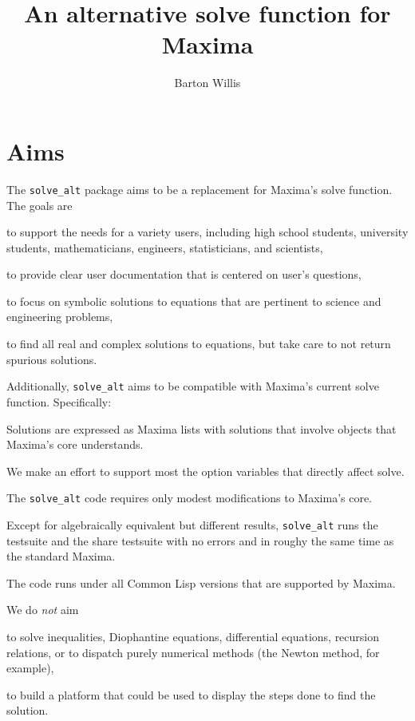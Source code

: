 \documentclass[]{scrartcl}
\title{An alternative solve function for Maxima}
\author{Barton Willis}
\newcommand{\altsolve}{\texttt{solve\_alt}}
\begin{document}
\maketitle

\section{Aims}


The \altsolve\/ package aims to be a replacement for Maxima's solve function. The goals are

\begin{alphalist}[]

\item to support the needs for a variety users, including high school students, university students, mathematicians, engineers, statisticians, and scientists,

\item to provide clear user documentation that is centered  on user's questions,

\item to focus on symbolic solutions to equations that are pertinent to science and engineering problems,

\item to find all real and complex solutions to equations, but take care to not return spurious solutions.

\end{alphalist}
Additionally, \altsolve\/  aims to be compatible with Maxima's current solve function. Specifically:

\begin{alphalist}[]

\item Solutions are expressed as Maxima lists with solutions that involve objects that Maxima's core  understands.

\item We make an effort to support most the option variables that directly affect solve.

 \item The \altsolve\/ code requires only modest modifications to Maxima's core.

\item Except for algebraically equivalent but different results, \altsolve\/  runs the testsuite and the share testsuite with no errors and in roughy the same time as the standard Maxima.

\item The code runs under all Common Lisp versions that are supported by Maxima.
\end{alphalist}
We do \emph{not} aim
\begin{alphalist}[]

\item to solve inequalities, Diophantine equations, differential equations, recursion relations, or to dispatch purely numerical methods (the Newton method, for example),

\item to build a platform that could be used to display the steps done to find the solution.

\end{alphalist}
\end{document}
